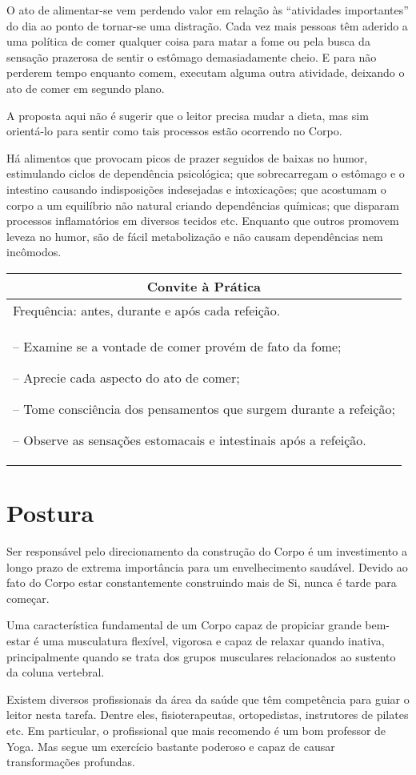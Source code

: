 \documentclass[oneside, 12pt]{book}
\newenvironment{prat}[1]
{\begin{center}
\begin{tabular}{p{0.9\textwidth}}
\hline\hline
\multicolumn{1}{c}{Convite à Prática}\\
\hline
Frequência: #1.\\
\hline
}{\\
\hline\hline
\end{tabular} 
\end{center}}
\begin{document}
O ato de alimentar-se vem perdendo valor em relação às ``atividades importantes'' do dia ao ponto de tornar-se uma distração. Cada vez mais pessoas têm aderido a uma política de comer qualquer coisa para matar a fome ou pela busca da sensação prazerosa de sentir o estômago demasiadamente cheio. E para não perderem tempo enquanto comem, executam alguma outra atividade, deixando o ato de comer em segundo plano.

A proposta aqui não é sugerir que o leitor precisa mudar a dieta, mas sim orientá-lo para sentir como tais processos estão ocorrendo no Corpo.

Há alimentos que provocam picos de prazer seguidos de baixas no humor, estimulando ciclos de dependência psicológica; que sobrecarregam o estômago e o intestino causando indisposições indesejadas e intoxicações; que acostumam o corpo a um equilíbrio não natural criando dependências químicas; que disparam processos inflamatórios em diversos tecidos etc. Enquanto que outros promovem leveza no humor, são de fácil metabolização e não causam dependências nem incômodos.

\begin{prat}{antes, durante e após cada refeição}
-- Examine se a vontade de comer provém de fato da fome;

-- Aprecie cada aspecto do ato de comer;

-- Tome consciência dos pensamentos que surgem durante a refeição;

-- Observe as sensações estomacais e intestinais após a refeição.
\end{prat}

\section*{Postura}

Ser responsável pelo direcionamento da construção do Corpo é um investimento a longo prazo de extrema importância para um envelhecimento saudável. Devido ao fato do Corpo estar constantemente construindo mais de Si, nunca é tarde para começar.

Uma característica fundamental de um Corpo capaz de propiciar grande bem-estar é uma musculatura flexível, vigorosa e capaz de relaxar quando inativa, principalmente quando se trata dos grupos musculares relacionados ao sustento da coluna vertebral.

Existem diversos profissionais da área da saúde que têm competência para guiar o leitor nesta tarefa. Dentre eles, fisioterapeutas, ortopedistas, instrutores de pilates etc. Em particular, o profissional que mais recomendo é um bom professor de Yoga. Mas segue um exercício bastante poderoso e capaz de causar transformações profundas.
\end{document}
